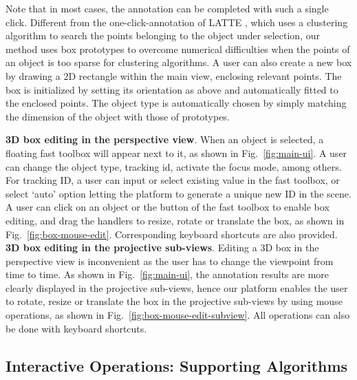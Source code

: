 \documentclass[letterpaper, 10 pt, conference]{ieeeconf}  %
\begin{document}
Note that in most cases, the annotation can be completed with such a single click. Different from the one-click-annotation of LATTE \cite{Wang2019LATTEAL}, which uses a clustering algorithm to search the points belonging to the object under selection, our method uses box prototypes to overcome numerical difficulties when the points of an object is too sparse for clustering algorithms. A user can also create a new box by drawing a 2D rectangle within the main view, enclosing relevant points. The box is initialized by setting its orientation as above and automatically fitted to the enclosed points. The object type is automatically chosen by simply matching the dimension of the object with those of prototypes.

\textbf{3D box editing in the perspective view}. When an object is selected, a floating fast toolbox will appear next to it, as shown in Fig.~\ref{fig:main-ui}. A user can change the object type, tracking id, activate the focus mode, among others. For tracking ID, a user can input or select existing value in the fast toolbox, or select `auto' option letting the platform to generate a unique new ID  in the scene. A user can click on an object or the button of the fast toolbox to enable box editing, and drag the handlers to resize, rotate or translate the box, as shown in Fig.~\ref{fig:box-mouse-edit}. Corresponding keyboard shortcuts are also provided.
\textbf{3D box editing in the projective sub-views}. Editing a 3D box in the perspective view is inconvenient as the user has to change the viewpoint from time to time. As shown in Fig.~\ref{fig:main-ui}, the annotation results are more clearly displayed in the projective sub-views,  hence our platform enables the user to rotate, resize or translate the box in the projective sub-views by using mouse operations, as shown in Fig.~\ref{fig:box-mouse-edit-subview}. All operations can also be done with keyboard shortcuts.



\subsection{Interactive Operations: Supporting Algorithms}
\label{sec:support-algorithms}
\end{document}
